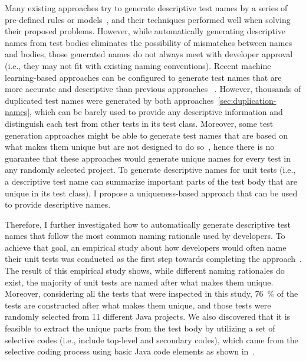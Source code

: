 Many existing approaches try to generate descriptive test names by a series of pre-defined rules or models~\cite{arcuri2014automated, zhang2015automatically, allamanis2015suggesting, daka2017generating, li2019deepfl}, and their techniques performed well when solving their proposed problems.
%
However, while automatically generating descriptive names from test bodies eliminates the possibility of mismatches between names and bodies, those generated names do not always meet with developer approval (i.e., they may not fit with existing naming conventions).
%
Recent machine learning-based approaches can be configured to generate test names that are more accurate and descriptive than previous approaches~\cite{alon2018code2seq,alon2019code2vec} .
%
However, thousands of duplicated test names were generated by both approaches~\cref{sec:duplication-names}, which can be barely used to provide any descriptive information and distinguish each test from other tests in its test class.
Moreover, some test generation approaches might be able to generate test names that are based on what makes them unique but are not designed to do so~\cite{arcuri2014automated,zhang2015automatically,allamanis2015suggesting,daka2017generating}, hence there is no guarantee that these approaches would generate unique names for every test in any randomly selected project.
To generate descriptive names for unit tests (i.e., a descriptive test name can summarize important parts of the test body that are unique in its test class), I propose a uniqueness-based approach that can be used to provide descriptive names.


Therefore, I further investigated how to automatically generate descriptive test names that follow the most common naming rationale used by developers.
%
To achieve that goal, an empirical study about how developers would often name their unit tests was conducted as the first step towards completing the approach~\cite{emp-study}.
%
The result of this empirical study shows, while different naming rationales do exist, the majority of unit tests are named after what makes them unique.
%
Moreover, considering all the tests that were inspected in this study, \SI{76}{\percent} of the tests are constructed after what makes them unique, and those tests were randomly selected from \num{11} different Java projects.
%
We also discovered that it is feasible to extract the unique parts from the test body by utilizing a set of selective codes (i.e., include top-level and secondary codes), which came from the selective coding process using basic Java code elements as shown in~\cite{emp-study}.


